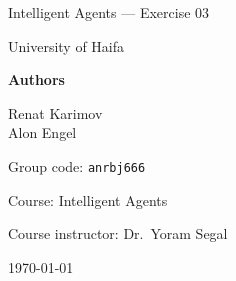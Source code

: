 \begin{titlepage}
    \centering
    \vspace*{2cm}
    {\LARGE\bfseries \BookTitle\par}
    \vspace{1.2cm}
    {\large Intelligent Agents --- Exercise 03\par}
    {\large University of Haifa\par}
    \vspace{1.5cm}
    {\large\bfseries Authors\par}
    \vspace{0.4cm}
    Renat Karimov \\
    Alon Engel \\
    \vspace{0.8cm}
    {\large Group code: \texttt{anrbj666}\par}
    \vspace{1.2cm}
    {\large Course: Intelligent Agents\par}
    {\large Course instructor: Dr.\ Yoram Segal\par}
    \vfill
    {\large \today\par}
\end{titlepage}
